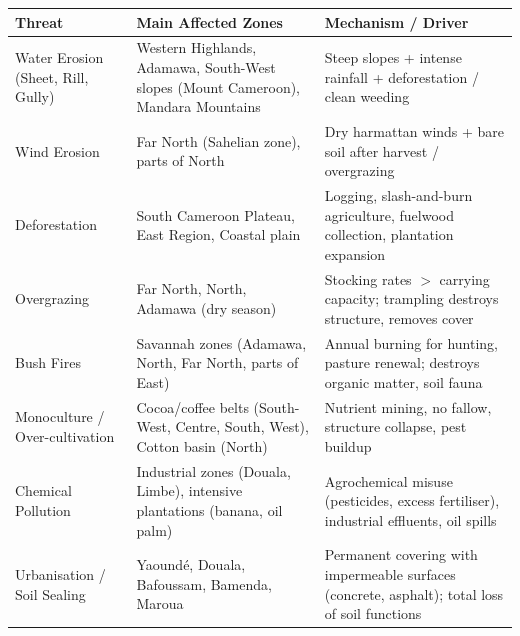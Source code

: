 \documentclass[11pt]{article}
\begin{document}
\begin{center}
\begin{tabularx}{\linewidth}{|l|X|X|}
\hline
\rowcolor{popblueL}
\textbf{Threat} & \textbf{Main Affected Zones} & \textbf{Mechanism / Driver} \\
\hline
Water Erosion (Sheet, Rill, Gully) & Western Highlands, Adamawa, South-West slopes (Mount Cameroon), Mandara Mountains & Steep slopes + intense rainfall + deforestation / clean weeding \\
\hline
Wind Erosion & Far North (Sahelian zone), parts of North & Dry harmattan winds + bare soil after harvest / overgrazing \\
\hline
Deforestation & South Cameroon Plateau, East Region, Coastal plain & Logging, slash-and-burn agriculture, fuelwood collection, plantation expansion \\
\hline
Overgrazing & Far North, North, Adamawa (dry season) & Stocking rates $>$ carrying capacity; trampling destroys structure, removes cover \\
\hline
Bush Fires & Savannah zones (Adamawa, North, Far North, parts of East) & Annual burning for hunting, pasture renewal; destroys organic matter, soil fauna \\
\hline
Monoculture / Over-cultivation & Cocoa/coffee belts (South-West, Centre, South, West), Cotton basin (North) & Nutrient mining, no fallow, structure collapse, pest buildup \\
\hline
Chemical Pollution & Industrial zones (Douala, Limbe), intensive plantations (banana, oil palm) & Agrochemical misuse (pesticides, excess fertiliser), industrial effluents, oil spills \\
\hline
Urbanisation / Soil Sealing & Yaoundé, Douala, Bafoussam, Bamenda, Maroua & Permanent covering with impermeable surfaces (concrete, asphalt); total loss of soil functions \\
\hline
\end{tabularx}
\end{center}
\end{document}
